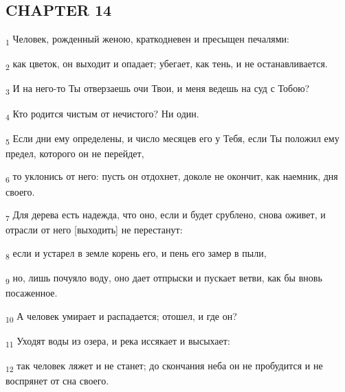 \subsection{CHAPTER 14}
\begin{tcolorbox}
\textsubscript{1} Человек, рожденный женою, краткодневен и пресыщен печалями:
\end{tcolorbox}
\begin{tcolorbox}
\textsubscript{2} как цветок, он выходит и опадает; убегает, как тень, и не останавливается.
\end{tcolorbox}
\begin{tcolorbox}
\textsubscript{3} И на него-то Ты отверзаешь очи Твои, и меня ведешь на суд с Тобою?
\end{tcolorbox}
\begin{tcolorbox}
\textsubscript{4} Кто родится чистым от нечистого? Ни один.
\end{tcolorbox}
\begin{tcolorbox}
\textsubscript{5} Если дни ему определены, и число месяцев его у Тебя, если Ты положил ему предел, которого он не перейдет,
\end{tcolorbox}
\begin{tcolorbox}
\textsubscript{6} то уклонись от него: пусть он отдохнет, доколе не окончит, как наемник, дня своего.
\end{tcolorbox}
\begin{tcolorbox}
\textsubscript{7} Для дерева есть надежда, что оно, если и будет срублено, снова оживет, и отрасли от него [выходить] не перестанут:
\end{tcolorbox}
\begin{tcolorbox}
\textsubscript{8} если и устарел в земле корень его, и пень его замер в пыли,
\end{tcolorbox}
\begin{tcolorbox}
\textsubscript{9} но, лишь почуяло воду, оно дает отпрыски и пускает ветви, как бы вновь посаженное.
\end{tcolorbox}
\begin{tcolorbox}
\textsubscript{10} А человек умирает и распадается; отошел, и где он?
\end{tcolorbox}
\begin{tcolorbox}
\textsubscript{11} Уходят воды из озера, и река иссякает и высыхает:
\end{tcolorbox}
\begin{tcolorbox}
\textsubscript{12} так человек ляжет и не станет; до скончания неба он не пробудится и не воспрянет от сна своего.
\end{tcolorbox}
